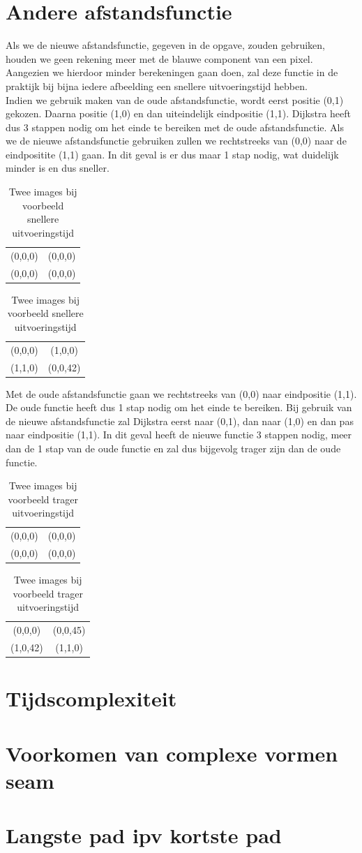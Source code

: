 \documentclass[11pt, a4paper]{article}
\begin{document}
\section*{Andere afstandsfunctie}
Als we de nieuwe afstandsfunctie, gegeven in de opgave, zouden gebruiken, houden we geen rekening meer met de blauwe component van een pixel. Aangezien we hierdoor minder berekeningen gaan doen, zal deze functie in de praktijk bij bijna iedere afbeelding een snellere uitvoeringstijd hebben.\\

Indien we gebruik maken van de oude afstandsfunctie, wordt eerst positie (0,1) gekozen. Daarna positie (1,0) en dan uiteindelijk eindpositie (1,1). Dijkstra heeft dus 3 stappen nodig om het einde te bereiken met de oude afstandsfunctie. Als we de nieuwe afstandsfunctie gebruiken zullen we rechtstreeks van (0,0) naar de eindpositite (1,1) gaan. In dit geval is er dus maar 1 stap nodig, wat duidelijk minder is en dus sneller.
\begin{table}[ht]
\centering
\begin{tabular}{|cc|}
\hline
(0,0,0) & (0,0,0) \\
(0,0,0) & (0,0,0) \\ \hline
\end{tabular}
\begin{tabular}{|cc|}
\hline
(0,0,0) & (1,0,0) \\
(1,1,0) & (0,0,42) \\ \hline
\end{tabular}
\caption{Twee images bij voorbeeld snellere uitvoeringstijd}
\end{table}

Met de oude afstandsfunctie gaan we rechtstreeks van (0,0) naar eindpositie (1,1). De oude functie heeft dus 1 stap nodig om het einde te bereiken. Bij gebruik van de nieuwe afstandsfunctie zal Dijkstra eerst naar (0,1), dan naar (1,0) en dan pas naar eindpositie (1,1). In dit geval heeft de nieuwe functie 3 stappen nodig, meer dan de 1 stap van de oude functie en zal dus bijgevolg trager zijn dan de oude functie.
\begin{table}[ht]
\centering
\begin{tabular}{|cc|}
\hline
(0,0,0) & (0,0,0) \\
(0,0,0) & (0,0,0) \\ \hline
\end{tabular}
\begin{tabular}{|cc|}
\hline
(0,0,0) & (0,0,45) \\
(1,0,42) & (1,1,0) \\ \hline
\end{tabular}
\caption{Twee images bij voorbeeld trager uitvoeringstijd}
\end{table}

\section*{Tijdscomplexiteit}
\section*{Voorkomen van complexe vormen seam}
\section*{Langste pad ipv kortste pad}


\newpage
\end{document}
